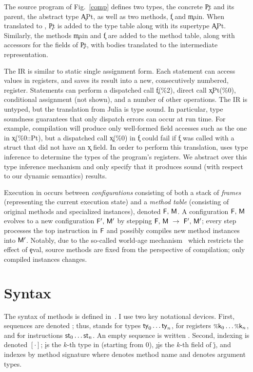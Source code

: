 The source program of Fig.~\ref{comp} defines two types, the concrete \c{Pt} and
its parent, the abstract type \c{APt}, as well as two methods, \c{f} and
\c{main}. When translated to \jules, \c{Pt} is added to the type table along
with its supertype \c{APt}. Similarly, the methods \c{main} and \c{f} are added
to the \jules method table, along with accessors for the fields of \c{Pt}, with
bodies translated to the \jules intermediate representation.

The \jules IR is similar to static single assignment form. Each statement can
access values in registers, and saves its result into a new, consecutively
numbered, register. Statements can perform a dispatched call \c{f(\%2)}, direct
call \c{x\!Pt(\%0)}, conditional assignment (not shown), and a number of other
operations. The IR is untyped, but the translation from Julia is type sound. In
particular, type soundness guarantees that only dispatch errors can occur at run
time. For example, compilation will produce only well-formed field accesses such
as the one in \c{x(\%0::Pt)}, but a dispatched call \c{x(\%0)} in \c{f} could
fail if \c{f} was called with a struct that did not have an \c{x} field. In
order to perform this translation, \jules uses type inference to determine the
types of the program's registers. We abstract over this type inference mechanism
and only specify that it produces sound (with respect to our dynamic semantics)
results. %

Execution in \jules occurs between \emph{configurations} consisting of both
a stack of \emph{frames} \frm (representing the current execution state)
and a \emph{method table} \mtbl (consisting of original methods and specialized
instances), denoted $\mathsf{F},\, \mathsf{M}$. A configuration
$\mathsf{F},\, \mathsf{M}$ evolves to a new configuration
$\mathsf{F}',\, \mathsf{M}'$ by stepping $\mathsf{F},\, \mathsf{M} ~\rightarrow~
\mathsf{F}',\, \mathsf{M}'$; every step processes the top instruction in $\mathsf{F}$
and possibly compiles new method instances into $\mathsf{M}'$. Notably, due to the
so-called world-age mechanism~\cite{oopsla20a} which restricts the effect
of \c{eval}, source methods are fixed from the
perspective of compilation; only compiled instances changes.

\section{Syntax}

The syntax of \jules methods is defined in~. I use two key
notational devices. First, sequences are denoted \ol{\,\cdot\,}; thus, \ol\ty
stands for types $\mathsf{ty}_0\dots\mathsf{ty}_n$, \ol{\v\k} for registers $\v\k_0\dots\v\k_n$,
and \ol\st for instructions $\mathsf{st}_0\dots\mathsf{st}_n$. An empty sequence is written
\emp. Second, indexing is denoted $[\cdot]$; \idx{\ol\ty}\k is the $k$-th type
in \ol\ty (starting from 0), \get\j\k is the $k$-th field of \v\j, and
\idx\mtbl{\msig\m{\ol\ty}} indexes \mtbl by method signature where \m denotes
method name and \ol\ty denotes argument types.

